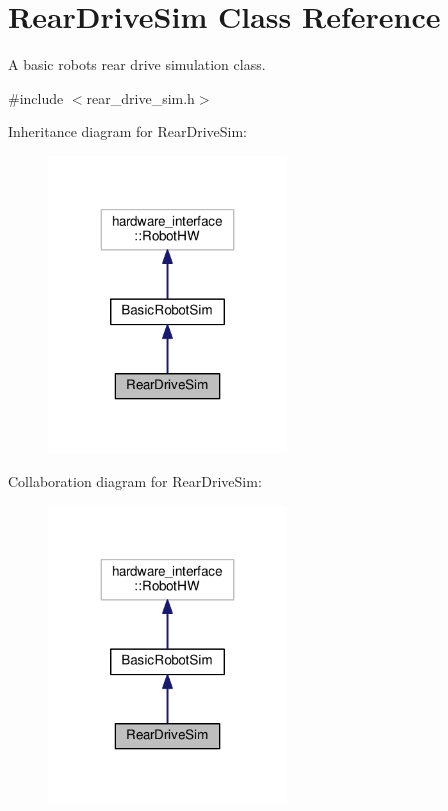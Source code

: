 \hypertarget{classRearDriveSim}{}\section{Rear\+Drive\+Sim Class Reference}
\label{classRearDriveSim}


A basic robot\textquotesingle{}s rear drive simulation class.  




{\ttfamily \#include $<$rear\+\_\+drive\+\_\+sim.\+h$>$}



Inheritance diagram for Rear\+Drive\+Sim\+:
\nopagebreak
\begin{figure}[H]
\begin{center}
\leavevmode
\includegraphics[width=179pt]{classRearDriveSim__inherit__graph}
\end{center}
\end{figure}


Collaboration diagram for Rear\+Drive\+Sim\+:
\nopagebreak
\begin{figure}[H]
\begin{center}
\leavevmode
\includegraphics[width=179pt]{classRearDriveSim__coll__graph}
\end{center}
\end{figure}
